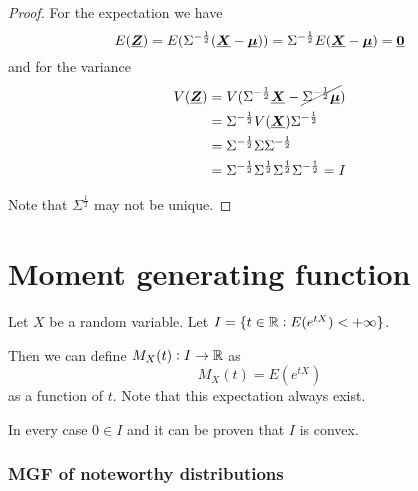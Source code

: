 \documentclass[12pt]{extarticle}
\renewcommand{\vec}[1]{\uvec{#1}}
\begin{document}
\begin{proof}
    For the expectation we have
    \begin{equation}
        E(\vec Z) = E(\Sigma^{-\frac{1}{2}} (\vec X -\vec \mu)) = \Sigma^{-\frac{1}{2}} E(\vec X -\vec \mu) = \vec 0
    \end{equation}
    and for the variance
    \begin{align}
        V(\vec Z) & = V(\Sigma^{-\frac{1}{2}} \vec X - \cancel{\Sigma^{-\frac{1}{2}} \vec \mu})                 \\
                  & = \Sigma^{-\frac{1}{2}} V(\vec X) \Sigma^{-\frac{1}{2}}                                     \\
                  & = \Sigma^{-\frac{1}{2}} \Sigma \Sigma^{-\frac{1}{2}}                                        \\
                  & = \Sigma^{-\frac{1}{2}} \Sigma^{\frac{1}{2}} \Sigma^{\frac{1}{2}} \Sigma^{-\frac{1}{2}} = I
    \end{align}

    Note that $\Sigma^{\frac{1}{2}}$ may not be unique.
\end{proof}

\section{Moment generating function}

\begin{definition}
    Let $X$ be a random variable.
    Let $I = \{t \in \mathbb{R} : E(e^{tX}) < + \infty \}$.

    Then we can define $M_X(t): I \to \mathbb{R}$ as
    \begin{equation}
        M_X(t) = E(e^{tX})
    \end{equation}
    as a function of $t$.
    Note that this expectation always exist.

    In every case $0 \in I$ and it can be proven that $I$ is convex.
\end{definition}

\subsubsection{MGF of noteworthy distributions}
\end{document}
